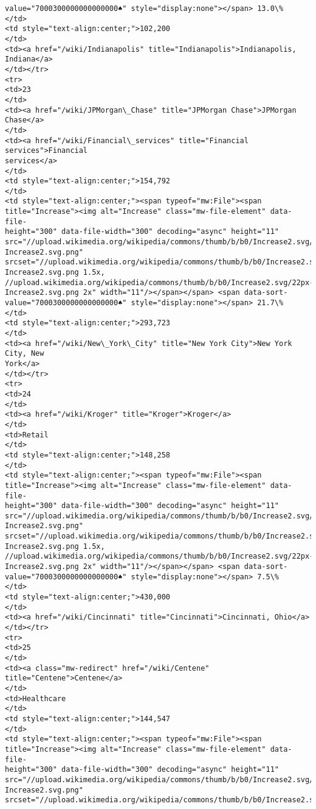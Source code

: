 \documentclass[11pt]{article}
\begin{document}
\begin{Verbatim}[commandchars=\\\{\}]
value="7000300000000000000♠" style="display:none"></span> 13.0\%
</td>
<td style="text-align:center;">102,200
</td>
<td><a href="/wiki/Indianapolis" title="Indianapolis">Indianapolis, Indiana</a>
</td></tr>
<tr>
<td>23
</td>
<td><a href="/wiki/JPMorgan\_Chase" title="JPMorgan Chase">JPMorgan Chase</a>
</td>
<td><a href="/wiki/Financial\_services" title="Financial services">Financial
services</a>
</td>
<td style="text-align:center;">154,792
</td>
<td style="text-align:center;"><span typeof="mw:File"><span
title="Increase"><img alt="Increase" class="mw-file-element" data-file-
height="300" data-file-width="300" decoding="async" height="11"
src="//upload.wikimedia.org/wikipedia/commons/thumb/b/b0/Increase2.svg/11px-
Increase2.svg.png"
srcset="//upload.wikimedia.org/wikipedia/commons/thumb/b/b0/Increase2.svg/17px-
Increase2.svg.png 1.5x,
//upload.wikimedia.org/wikipedia/commons/thumb/b/b0/Increase2.svg/22px-
Increase2.svg.png 2x" width="11"/></span></span> <span data-sort-
value="7000300000000000000♠" style="display:none"></span> 21.7\%
</td>
<td style="text-align:center;">293,723
</td>
<td><a href="/wiki/New\_York\_City" title="New York City">New York City, New
York</a>
</td></tr>
<tr>
<td>24
</td>
<td><a href="/wiki/Kroger" title="Kroger">Kroger</a>
</td>
<td>Retail
</td>
<td style="text-align:center;">148,258
</td>
<td style="text-align:center;"><span typeof="mw:File"><span
title="Increase"><img alt="Increase" class="mw-file-element" data-file-
height="300" data-file-width="300" decoding="async" height="11"
src="//upload.wikimedia.org/wikipedia/commons/thumb/b/b0/Increase2.svg/11px-
Increase2.svg.png"
srcset="//upload.wikimedia.org/wikipedia/commons/thumb/b/b0/Increase2.svg/17px-
Increase2.svg.png 1.5x,
//upload.wikimedia.org/wikipedia/commons/thumb/b/b0/Increase2.svg/22px-
Increase2.svg.png 2x" width="11"/></span></span> <span data-sort-
value="7000300000000000000♠" style="display:none"></span> 7.5\%
</td>
<td style="text-align:center;">430,000
</td>
<td><a href="/wiki/Cincinnati" title="Cincinnati">Cincinnati, Ohio</a>
</td></tr>
<tr>
<td>25
</td>
<td><a class="mw-redirect" href="/wiki/Centene" title="Centene">Centene</a>
</td>
<td>Healthcare
</td>
<td style="text-align:center;">144,547
</td>
<td style="text-align:center;"><span typeof="mw:File"><span
title="Increase"><img alt="Increase" class="mw-file-element" data-file-
height="300" data-file-width="300" decoding="async" height="11"
src="//upload.wikimedia.org/wikipedia/commons/thumb/b/b0/Increase2.svg/11px-
Increase2.svg.png"
srcset="//upload.wikimedia.org/wikipedia/commons/thumb/b/b0/Increase2.svg/17px-

\end{Verbatim}
\end{document}
